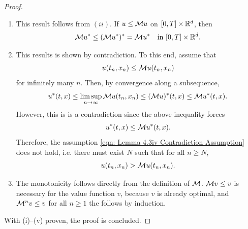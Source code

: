 \begin{proof}
\begin{enumerate}[label=(\roman*)]
\begin{align*}
        &= \limsup_{n \rightarrow \infty} \InterveneOper u^* (t_n,x_n),
    \end{align*}
    which shows that $\InterveneOper u^* \in \USC([0,T] \times \R^d)$. Moreover, for the second assertion, we note that since
    \begin{equation*}
        \InterveneOper u \leq \InterveneOper u^* \quad \text{in } [0,T] \times \R^d,
    \end{equation*}
    we get, in a similar manner as in $(ii)$, 
    \begin{equation*}
        \InterveneOper u^* \leq (\InterveneOper u^*)^* = \InterveneOper u^* \quad \text{in } [0,T] \times \R^d. 
    \end{equation*}

    \item This result follows from $(ii)$. If $u \leq \mathcal{M} u$ on $[0,T] \times \mathbb{R}^d$, then
        \begin{equation*}
            \InterveneOper u^* \leq (\InterveneOper u^*)^* = \InterveneOper u^* \quad \text{in } [0,T] \times \R^d. 
        \end{equation*}
    
    \item This results is shown by contradiction. To this end, assume that 
        \begin{equation}
            u(t_n,x_n) \leq \mathcal{M} u(t_n,x_n)
            \label{eqn: Lemma 4.3iv Contradiction Assumption}
        \end{equation}
        for infinitely many $n$. Then, by convergence along a subsequence, 
        \begin{equation*}
            u^*(t,x) \leq \limsup_{n \rightarrow \infty} \mathcal{M} u(t_n,x_n) \leq (\mathcal{M} u)^*(t,x) \leq \mathcal{M} u^*(t,x).
        \end{equation*}
        However, this is is a contradiction since the above inequality forces
        \begin{equation*}
            u^*(t,x) \leq \mathcal{M} u^*(t,x).    
        \end{equation*}
        Therefore, the assumption \eqref{eqn: Lemma 4.3iv Contradiction Assumption} does not hold, i.e. there must exist $N$ such that for all $n \geq N$,
        \begin{equation*}
            u(t_n,x_n) > \mathcal{M} u(t_n,x_n). 
        \end{equation*}
    \item The monotonicity follows directly from the definition of $\mathcal{M}$. $\mathcal{M} v \leq v$ is necessary for the value function $v$, because $v$ is already optimal, and $\mathcal{M}^n v \leq v$ for all $n \geq 1$ the follows by induction.
    \end{enumerate}
    With (i)--(v) proven, the proof is concluded. 
\end{proof}

